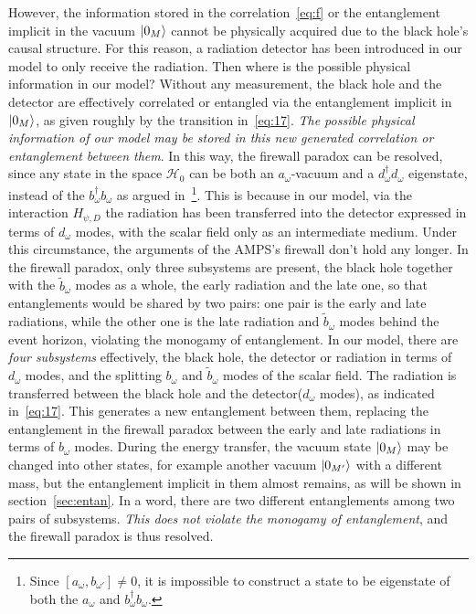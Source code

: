 \documentclass[12pt,a4paper]{article}
\begin{document}
However, the information stored in the correlation~\eqref{eq:f} or the entanglement implicit in the vacuum $\arrowvert0_M\rangle$ cannot be physically acquired due to the black hole's causal structure. For this reason, a radiation detector has been introduced in our model to only receive the radiation.
Then where is the possible physical information in our model? Without any
measurement, the black hole and the detector are effectively correlated or
entangled via the entanglement implicit in $\arrowvert0_M\rangle$, as
given roughly by the transition in~\eqref{eq:17}. \emph{The possible physical information of our model may be stored in
this new generated correlation or entanglement between them}. In this way, the firewall paradox can be resolved, since any state in the space $\mathcal
{H}_0$ can be both an $a_{\omega}$-vacuum and a
$d_{\omega}^{\dag}d_{\omega}$ eigenstate, instead of the
$b_{\omega}^{\dag}b_{\omega}$ as argued in~\cite{d}\footnote{Since $[a_{\omega},b_{\omega'}]\neq 0$,
it is impossible to construct a state to be eigenstate of both the
$a_{\omega}$ and $b_{\omega}^{\dag}b_{\omega}$.}. This is because in our model, via the interaction $H_{\psi,D}$ the radiation has been transferred into
the detector expressed in terms of $d_{\omega}$ modes, with the scalar field only as an intermediate medium. Under this circumstance, the arguments of the
AMPS's firewall don't hold any longer. In the firewall paradox, only
three subsystems are present, the black hole together with the $\tilde{b}_{\omega}$ modes as a whole, the early radiation and the late one, so that entanglements would be shared by two
pairs: one pair is the early and late radiations, while the
other one is the late radiation and $\tilde{b}_{\omega}$ modes behind the event horizon,
violating the monogamy of entanglement. In our model, there are \emph{four subsystems} effectively, the black hole, the detector or radiation in terms of $d_{\omega}$ modes,
and the splitting $b_{\omega}$ and $\tilde{b}_{\omega}$ modes of the scalar field. The radiation is transferred between the black hole and the detector($d_{\omega}$ modes), as indicated in~\eqref{eq:17}. This generates a new entanglement between them, replacing the entanglement in the firewall paradox between the early and late radiations in terms of $b_{\omega}$ modes. During the energy transfer, the vacuum state $\arrowvert0_{M}\rangle$ may be changed into other states, for example another vacuum
$\arrowvert0_{M'}\rangle$ with a different mass, but the entanglement implicit in
them almost remains, as will be shown in
section~\ref{sec:entan}. In a word, there are two different entanglements among two pairs of subsystems. \emph{This does not violate
the monogamy of entanglement}, and the firewall paradox is thus resolved.
\end{document}
